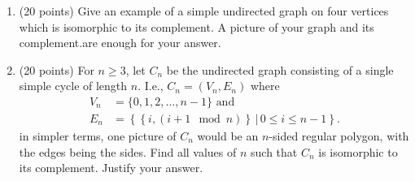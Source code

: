 \documentclass[12 pt]{amsart}
\newcommand{\lra}{\Leftrightarrow}
\newtheorem{df}[thm]{Definition}
\begin{document}
\begin{enumerate}[label=\arabic*.)]
		\begin{enumerate}[label=(\alph*)]
			\item What is $|V_n|$?
			\item What is $|E_n|$? \emph{Justify your answer.}
			\item Does $H_{17}$ have an Eulerian cycle? \emph{Justify your answer.}
			\item Does $H_{42}$ have an Eulerian cycle? \emph{Justify your answer.}
			\item Find a Hamiltonian cycle in $H_2$. List the sequence of vertices.
			\item Find a Hamiltonian cycle in $H_3$. List the sequence of vertices.
			\item Find a Hamiltonian cycle in $H_4$. List the sequence of vertices.
		\end{enumerate}
	
	\vspace{1cm}	
	
	\begin{df}
		Define the \emph{complement} of a graph, $G = (V,E)$, (either directed or undirected) as the graph $\overline{G} = (V,\overline{E})$ which has the same vertex set and where for every pair of distinct vertices, $v$ and $w$, $(v,w) \in \overline{E} \lra (v,w)\not\in E$.
		That is to say, there's an edge in $\overline{G}$ if and only if there isn't an edge in $G$.
		Or, to look at another way: take the adjacency matrix for $G$ and (except on the main diagonal) change each one to a zero and each zero to a one.
		The resulting matrix is the adjacency matrix for $\overline{G}$.
	\end{df}
	
	\bigskip
	
	\item (20 points) Give an example of a simple undirected graph on four vertices which is isomorphic to its complement.
	A picture of your graph and its complement.are enough for your answer.
	
	\bigskip
	
	\item (20 points) For $n \geq 3$, let $C_n$ be the undirected graph consisting of a single simple cycle of length $n$.
	I.e., $C_n = (V_n, E_n)$ where
	\begin{align*}
		V_n &= \{0, 1, 2, \dotsc, n-1 \} \text{ and} \\
		E_n &= \left\{\left\{i, (i+1 \!\! \mod n)\right\} \,|\, 0 \leq i \leq n-1 \right\}.
	\end{align*}
	in simpler terms, one picture of $C_n$ would be an $n$-sided regular polygon, with the edges being the sides.
	Find all values of $n$ such that $C_n$ is isomorphic to its complement.
	Justify your answer.
	
\end{enumerate}
\end{document}
